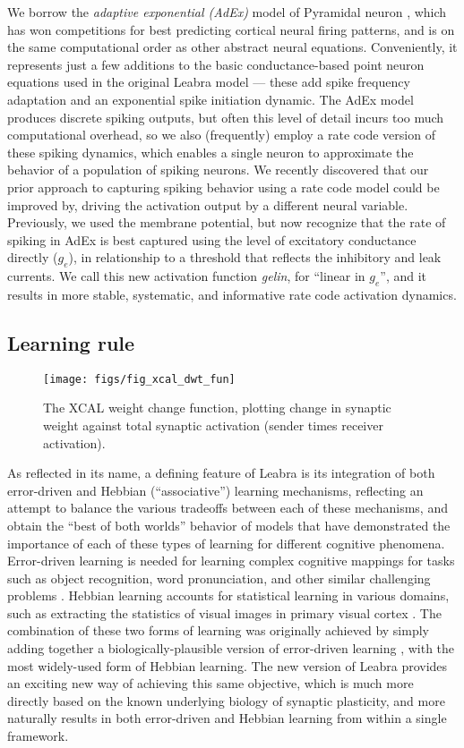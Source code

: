 \documentclass[11pt,twoside]{article}
\begin{document}
We borrow the {\em adaptive exponential (AdEx)} model of Pyramidal neuron \cite{Gerstner}, which has won competitions for best predicting cortical neural firing patterns, and is on the same computational order as other abstract neural equations.  Conveniently, it represents just a few additions to the basic conductance-based point neuron equations used in the original Leabra model --- these add spike frequency adaptation and an exponential spike initiation dynamic.  The AdEx model produces discrete spiking outputs, but often this level of detail incurs too much computational overhead, so we also (frequently) employ a rate code version of these spiking dynamics, which enables a single neuron to approximate the behavior of a population of spiking neurons.  We recently discovered that our prior approach to capturing spiking behavior using a rate code model could be improved by, driving the activation output by a different neural variable.  Previously, we used the membrane potential, but now recognize that the rate of spiking in AdEx is best captured using the level of excitatory conductance directly ($g_e$), in relationship to a threshold that reflects the inhibitory and leak currents.  We call this new activation function {\em gelin}, for ``linear in $g_e$'', and it results in more stable, systematic, and informative rate code activation dynamics.

\subsection{Learning rule}

\begin{figure}
  \centering\texttt{[image: figs/fig\_xcal\_dwt\_fun]}
  \caption{\small The XCAL weight change function, plotting change in synaptic weight against total synaptic activation (sender times receiver activation).}
  \label{fig.xcal_fun}
\end{figure}

As reflected in its name, a defining feature of Leabra is its integration of both error-driven and Hebbian (``associative'') learning mechanisms, reflecting an attempt to balance the various tradeoffs between each of these mechanisms, and obtain the ``best of both worlds'' behavior of models that have demonstrated the importance of each of these types of learning for different cognitive phenomena.  Error-driven learning is needed for learning complex cognitive mappings for tasks such as object recognition, word pronunciation, and other similar challenging problems \cite{cites}.  Hebbian learning accounts for statistical learning in various domains, such as extracting the statistics of visual images in primary visual cortex \cite{OlshausenField9X}.  The combination of these two forms of learning was originally achieved by simply adding together a biologically-plausible version of error-driven learning \cite{OReilly96}, with the most widely-used form of Hebbian learning.  The new version of Leabra provides an exciting new way of achieving this same objective, which is much more directly based on the known underlying biology of synaptic plasticity, and more naturally results in both error-driven and Hebbian learning from within a single framework.
\end{document}
